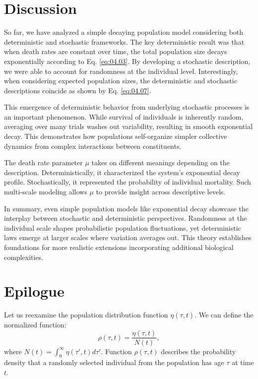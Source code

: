 \section{Discussion}

So far, we have analyzed a simple decaying population model considering both deterministic and stochastic frameworks. The key deterministic result was that when death rates are constant over time, the total population size decays exponentially according to Eq. \eqref{eq:04.03}. By developing a stochastic description, we were able to account for randomness at the individual level. Interestingly, when considering expected population sizes, the deterministic and stochastic descriptions coincide as shown by Eq. \eqref{eq:04.07}.

This emergence of deterministic behavior from underlying stochastic processes is an important phenomenon. While survival of individuals is inherently random, averaging over many trials washes out variability, resulting in smooth exponential decay. This demonstrates how populations self-organize simpler collective dynamics from complex interactions between constituents.

The death rate parameter $\mu$ takes on different meanings depending on the description. Deterministically, it characterized the system's exponential decay profile. Stochastically, it represented the probability of individual mortality. Such multi-scale modeling allows $\mu$ to provide insight across descriptive levels.

In summary, even simple population models like exponential decay showcase the interplay between stochastic and deterministic perspectives. Randomness at the individual scale shapes probabilistic population fluctuations, yet deterministic laws emerge at larger scales where variation averages out. This theory establishes foundations for more realistic extensions incorporating additional biological complexities.

\section{Epilogue}

Let us reexamine the population distribution function $\eta(\tau,t)$. We can define the normalized function:
\begin{equation*}
\rho(\tau,t) = \frac{\eta(\tau,t)}{N(t)},
\end{equation*}
where $N(t) = \int_0^\infty \eta(\tau',t) d\tau'$. Function $\rho(\tau,t)$ describes the probability density that a randomly selected individual from the population has age $\tau$ at time $t$. 

